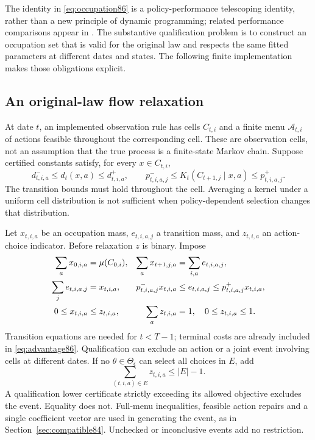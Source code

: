 The identity in \eqref{eq:occupation86} is a policy-performance telescoping identity, rather than a new principle of dynamic programming; related performance comparisons appear in \citet{munos2003,kakade2002}. The substantive qualification problem is to construct an occupation set that is valid for the original law and respects the same fitted parameters at different dates and states. The following finite implementation makes those obligations explicit.

\subsection{An original-law flow relaxation}
At date $t$, an implemented observation rule has cells $C_{t,i}$ and a finite menu $\mathcal A_{t,i}$ of actions feasible throughout the corresponding cell. These are observation cells, not an assumption that the true process is a finite-state Markov chain. Suppose certified constants satisfy, for every $x\in C_{t,i}$,
\[
 d_{t,i,a}^-\le d_t(x,a)\le d_{t,i,a}^+,\qquad
 p_{t,i,a,j}^-\le K_t(C_{t+1,j}\mid x,a)\le p_{t,i,a,j}^+.
\]
The transition bounds must hold throughout the cell. Averaging a kernel under a uniform cell distribution is not sufficient when policy-dependent selection changes that distribution.

Let $x_{t,i,a}$ be an occupation mass, $e_{t,i,a,j}$ a transition mass, and $z_{t,i,a}$ an action-choice indicator. Before relaxation $z$ is binary. Impose
\begin{align}\label{eq:flows86}
 \sum_a x_{0,i,a}&=\mu(C_{0,i}), &
 \sum_a x_{t+1,j,a}&=\sum_{i,a}e_{t,i,a,j},\\
 \sum_j e_{t,i,a,j}&=x_{t,i,a}, &
 p_{t,i,a,j}^-x_{t,i,a}&\le e_{t,i,a,j}\le p_{t,i,a,j}^+x_{t,i,a},\\
 0\le x_{t,i,a}&\le z_{t,i,a}, &
 \sum_a z_{t,i,a}&=1,\quad 0\le z_{t,i,a}\le1.\notag
\end{align}
Transition equations are needed for $t<T-1$; terminal costs are already included in \eqref{eq:advantage86}. Qualification can exclude an action or a joint event involving cells at different dates. If no $\theta\in\Theta_\epsilon$ can select all choices in $E$, add
\begin{equation}\label{eq:flow-conflict86}
 \sum_{(t,i,a)\in E}z_{t,i,a}\le |E|-1.
\end{equation}
A qualification lower certificate strictly exceeding its allowed objective excludes the event. Equality does not. Full-menu inequalities, feasible action repairs and a single coefficient vector are used in generating the event, as in Section~\ref{sec:compatible84}. Unchecked or inconclusive events add no restriction.

